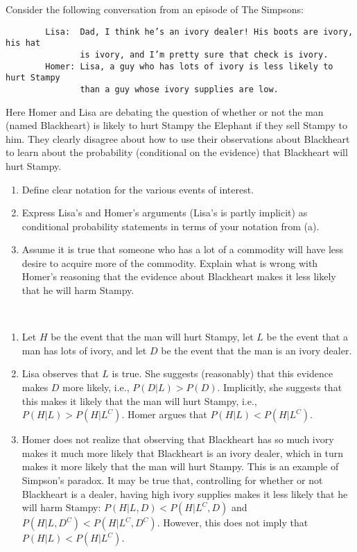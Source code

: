 

\setcounter{theorem}{21}
\begin{exercise}[BH.2.22] 
  Consider the following conversation from an episode of The Simpsons:
	
	\begin{verbatim}
		Lisa:  Dad, I think he’s an ivory dealer! His boots are ivory, his hat
		       is ivory, and I’m pretty sure that check is ivory.
		Homer: Lisa, a guy who has lots of ivory is less likely to hurt Stampy 
		       than a guy whose ivory supplies are low.
	\end{verbatim}

	Here Homer and Lisa are debating the question of whether or not the man (named Blackheart) is likely to hurt Stampy the Elephant if they sell Stampy to him. They clearly disagree about how to use their observations about Blackheart to learn about the probability (conditional on the evidence) that Blackheart will hurt Stampy.
	\begin{enumerate}
		\item Define clear notation for the various events of interest.
		\item Express Lisa's and Homer's arguments (Lisa's is partly implicit) as conditional probability statements in terms of your notation from (a).
		\item Assume it is true that someone who has a lot of a commodity will have less desire to acquire more of the commodity. Explain what is wrong with Homer's reasoning that the evidence about Blackheart makes it less likely that he will harm Stampy.
	\end{enumerate}
\begin{solution}~
	\begin{enumerate}
		\item Let $H$ be the event that the man will hurt Stampy, let $L$ be the event that a man has lots of ivory, and let $D$ be the event that the man is an ivory dealer.
		\item Lisa observes that $L$ is true. She suggests (reasonably) that this evidence makes $D$ more likely, i.e., $P(D|L) > P(D)$. Implicitly, she suggests that this makes it likely that the man will hurt Stampy, i.e., $P(H|L) > P(H|L^C)$. Homer argues that $P(H|L) < P(H|L^C)$.
		\item Homer does not realize that observing that Blackheart has so much ivory makes it much more likely that Blackheart is an ivory dealer, which in turn makes it more likely that the man will hurt Stampy. This is an example of Simpson’s paradox. It may be true that, controlling for whether or not Blackheart is a dealer, having high ivory supplies makes it less likely that he will harm Stampy: $P(H|L, D) < P(H|L^C,D)$ and $P(H|L, D^C) < P(H|L^C,D^C)$. However, this does not imply that $P(H|L) < P(H|L^{C})$.
	\end{enumerate}
\end{solution}
\end{exercise}

